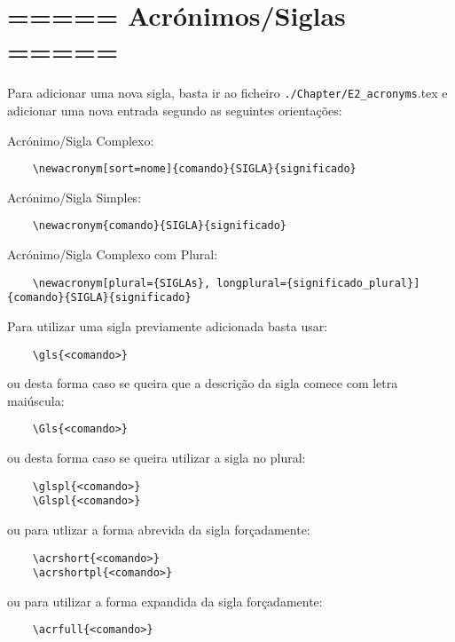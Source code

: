 \section{===== Acrónimos/Siglas =====}

Para adicionar uma nova sigla, basta ir ao ficheiro \verb|./Chapter/E2_acronyms|.tex e adicionar uma nova entrada segundo as seguintes orientações:

Acrónimo/Sigla Complexo:
\begin{verbatim}
    \newacronym[sort=nome]{comando}{SIGLA}{significado}
\end{verbatim}

Acrónimo/Sigla Simples:
\begin{verbatim}
    \newacronym{comando}{SIGLA}{significado}
\end{verbatim}

Acrónimo/Sigla Complexo com Plural:
\begin{verbatim}
    \newacronym[plural={SIGLAs}, longplural={significado_plural}]{comando}{SIGLA}{significado}
\end{verbatim}

Para utilizar uma sigla previamente adicionada basta usar:

\begin{verbatim}
    \gls{<comando>}
\end{verbatim}

ou desta forma caso se queira que a descrição da sigla comece com letra maiúscula:

\begin{verbatim}
    \Gls{<comando>}
\end{verbatim}

ou desta forma caso se queira utilizar a sigla no plural:

\begin{verbatim}
    \glspl{<comando>}
    \Glspl{<comando>}
\end{verbatim}

ou para utlizar a forma abrevida da sigla forçadamente:

\begin{verbatim}
    \acrshort{<comando>}
    \acrshortpl{<comando>}
\end{verbatim}

ou para utilizar a forma expandida da sigla forçadamente:

\begin{verbatim}
    \acrfull{<comando>}
\end{verbatim}


